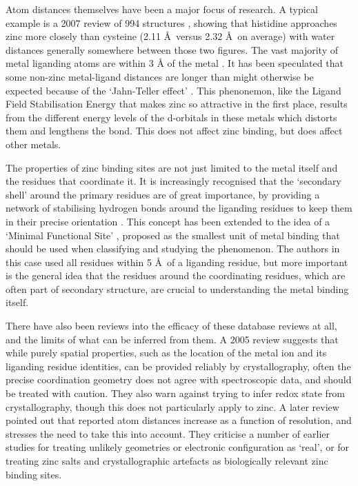 Atom distances themselves have been a major focus of research. A typical example is a 2007 review of 994 structures \cite{tamames2007analysis}, showing that histidine approaches zinc more closely than cysteine (2.11 \AA \ versus 2.32 \AA \ on average) with water distances generally somewhere between those two figures. The vast majority of metal liganding atoms are within 3 {\AA} of the metal \cite{dokmanic2008metals}. It has been speculated that some non-zinc metal-ligand distances are longer than might otherwise be expected because of the `Jahn-Teller effect' \cite{doi:10.1002/prot.21601}. This phenonemon, like the Ligand Field Stabilisation Energy that makes zinc so attractive in the first place, results from the different energy levels of the d-orbitals in these metals which distorts them and lengthens the bond. This does not affect zinc binding, but does affect other metals.

The properties of zinc binding sites are not just limited to the metal itself and the residues that coordinate it. It is increasingly recognised that the `secondary shell' around the primary residues are of great importance, by providing a network of stabilising hydrogen bonds around the liganding residues to keep them in their precise orientation \cite{auld2001zinc}. This concept has been extended to the idea of a `Minimal Functional Site' \cite{andreini2011minimal}, proposed as the smallest unit of metal binding that should be used when classifying and studying the phenomenon. The authors in this case used all residues within 5 \AA \ of a liganding residue, but more important is the general idea that the residues around the coordinating residues, which are often part of secondary structure, are crucial to understanding the metal binding itself.

There have also been reviews into the efficacy of these database reviews at all, and the limits of what can be inferred from them. A 2005 review \cite{sommerhalter2005x} suggests that while purely spatial properties, such as the location of the metal ion and its liganding residue identities, can be provided reliably by crystallography, often the precise coordination geometry does not agree with spectroscopic data, and should be treated with caution. They also warn against trying to infer redox state from crystallography, though this does not particularly apply to zinc. A later review \cite{laitaoja2013zinc} pointed out that reported atom distances increase as a function of resolution, and stresses the need to take this into account. They criticise a number of earlier studies for treating unlikely geometries or electronic configuration as `real', or for treating zinc salts and crystallographic artefacts as biologically relevant zinc binding sites.

